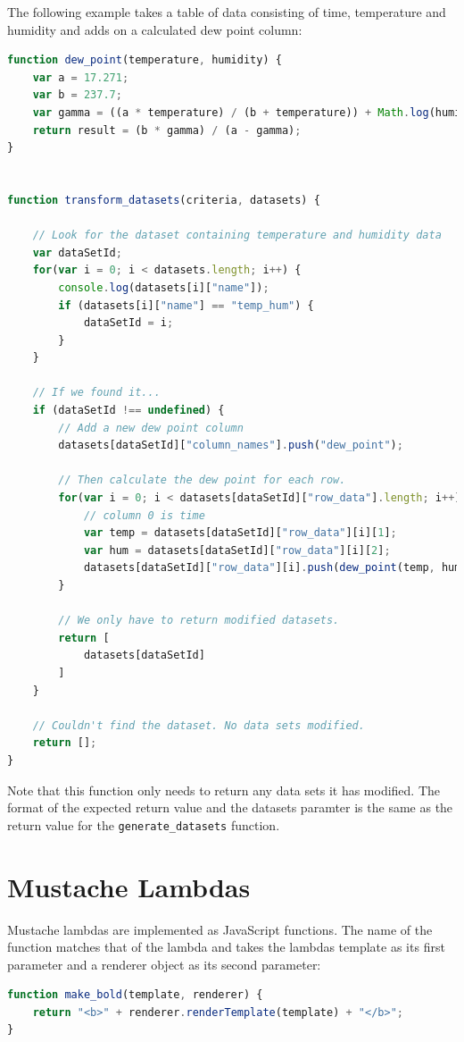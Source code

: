 \documentclass[a4paper,10pt]{book}
\begin{document}
The following example takes a table of data consisting of time, temperature and humidity and adds on a calculated dew point column:
\begin{lstlisting}[language=javascript]
function dew_point(temperature, humidity) {
	var a = 17.271;
	var b = 237.7;
	var gamma = ((a * temperature) / (b + temperature)) + Math.log(humidity / 100.0);
	return result = (b * gamma) / (a - gamma);
}


function transform_datasets(criteria, datasets) {
	
	// Look for the dataset containing temperature and humidity data
	var dataSetId;	
	for(var i = 0; i < datasets.length; i++) {
		console.log(datasets[i]["name"]);
		if (datasets[i]["name"] == "temp_hum") {
			dataSetId = i;
		}
	}
	
	// If we found it...
	if (dataSetId !== undefined) {
		// Add a new dew point column
		datasets[dataSetId]["column_names"].push("dew_point");
		
		// Then calculate the dew point for each row.
		for(var i = 0; i < datasets[dataSetId]["row_data"].length; i++) {
			// column 0 is time
			var temp = datasets[dataSetId]["row_data"][i][1];
			var hum = datasets[dataSetId]["row_data"][i][2];
			datasets[dataSetId]["row_data"][i].push(dew_point(temp, hum));
		}
		
		// We only have to return modified datasets.
		return [
			datasets[dataSetId]
		]
	}
	
	// Couldn't find the dataset. No data sets modified.
	return [];
}
\end{lstlisting}

Note that this function only needs to return any data sets it has modified. The format of the expected return value and the datasets paramter is the same as the return value for the \verb|generate_datasets| function.

\section{Mustache Lambdas}
Mustache lambdas are implemented as JavaScript functions. The name of the function matches that of the lambda and takes the lambdas template as its first parameter and a renderer object as its second parameter:

\begin{lstlisting}[language=javascript]
function make_bold(template, renderer) {
	return "<b>" + renderer.renderTemplate(template) + "</b>";
}
\end{lstlisting}
\end{document}
